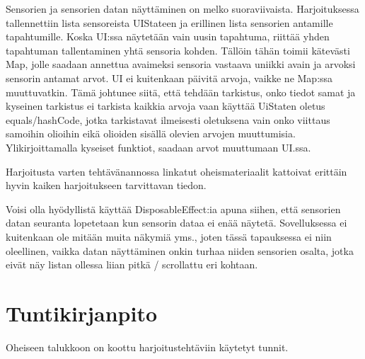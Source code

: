 Sensorien ja sensorien datan näyttäminen on melko suoraviivaista.
Harjoituksessa tallennettiin lista sensoreista UIStateen ja erillinen lista
sensorien antamille tapahtumille. Koska UI:ssa näytetään vain uusin tapahtuma,
riittää yhden tapahtuman tallentaminen yhtä sensoria kohden. Tällöin tähän
toimii kätevästi Map, jolle saadaan annettua avaimeksi sensoria vastaava
uniikki avain ja arvoksi sensorin antamat arvot. UI ei kuitenkaan päivitä
arvoja, vaikke ne Map:ssa muuttuvatkin. Tämä johtunee siitä, että tehdään
tarkistus, onko tiedot samat ja kyseinen tarkistus ei tarkista kaikkia arvoja
vaan käyttää UiStaten oletus equals/hashCode, jotka tarkistavat ilmeisesti
oletuksena vain onko viittaus samoihin olioihin eikä olioiden sisällä olevien
arvojen muuttumisia. Ylikirjoittamalla kyseiset funktiot, saadaan arvot
muuttumaan UI.ssa.

Harjoitusta varten tehtävänannossa linkatut oheismateriaalit
\parencite{AndroidDevelopersDocsSensors}
\parencite{AndroidDevelopersCodelabsSensorData} kattoivat erittäin hyvin kaiken
harjoitukseen tarvittavan tiedon.

Voisi olla hyödyllistä käyttää DisposableEffect:ia apuna siihen, että sensorien
datan seuranta lopetetaan kun sensorin dataa ei enää näytetä. Sovelluksessa ei
kuitenkaan ole mitään muita näkymiä yms., joten tässä tapauksessa ei niin
oleellinen, vaikka datan näyttäminen onkin turhaa niiden sensorien osalta,
jotka eivät näy listan ollessa liian pitkä / scrollattu eri kohtaan.

\section{Tuntikirjanpito}

Oheiseen talukkoon on koottu harjoitustehtäviin käytetyt tunnit.


